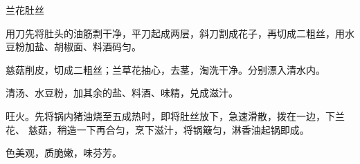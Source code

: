 %
%
%
%
%
%
%
\begin{recipe}{兰花肚丝}

\ingredients


\preparation

\step 用刀先将肚头的油筋剽干净，平刀起成两层，斜刀割成花子，再切成二粗丝，用水
豆粉加盐、胡椒面、料酒码匀。

\step 慈菇削皮，切成二粗丝；兰草花抽心，去茎，淘洗干净。分别漂入清水内。

\step 清汤、水豆粉，加其余的盐、料酒、味精，兑成滋汁。

\step 旺火。先将锅内猪油烧至五成热时，即将肚丝放下，急速滑散，拨在一边，下兰花、
慈菇，稍造一下再合匀，烹下滋汁，将锅簸匀，淋香油起锅即成。

\features

色美观，质脆嫩，味芬芳。

\end{recipe}

